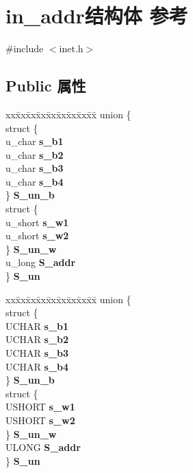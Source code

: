 \hypertarget{structin__addr}{}\section{in\+\_\+addr结构体 参考}
\label{structin__addr}


{\ttfamily \#include $<$inet.\+h$>$}

\subsection*{Public 属性}
\begin{DoxyCompactItemize}
\item 
\mbox{\label{structin__addr_a83cb466b4e27637f9dc381afa9f4c022}} 
\begin{tabbing}
xx\=xx\=xx\=xx\=xx\=xx\=xx\=xx\=xx\=\kill
union \{\\
\>struct \{\\
\>\>u\_char {\bfseries s\_b1}\\
\>\>u\_char {\bfseries s\_b2}\\
\>\>u\_char {\bfseries s\_b3}\\
\>\>u\_char {\bfseries s\_b4}\\
\>\} {\bfseries S\_un\_b}\\
\>struct \{\\
\>\>u\_short {\bfseries s\_w1}\\
\>\>u\_short {\bfseries s\_w2}\\
\>\} {\bfseries S\_un\_w}\\
\>u\_long {\bfseries S\_addr}\\
\} {\bfseries S\_un}\\

\end{tabbing}\item 
\mbox{\label{structin__addr_afa31e3df374c800b6c1a587cc26eef59}} 
\begin{tabbing}
xx\=xx\=xx\=xx\=xx\=xx\=xx\=xx\=xx\=\kill
union \{\\
\>struct \{\\
\>\>UCHAR {\bfseries s\_b1}\\
\>\>UCHAR {\bfseries s\_b2}\\
\>\>UCHAR {\bfseries s\_b3}\\
\>\>UCHAR {\bfseries s\_b4}\\
\>\} {\bfseries S\_un\_b}\\
\>struct \{\\
\>\>USHORT {\bfseries s\_w1}\\
\>\>USHORT {\bfseries s\_w2}\\
\>\} {\bfseries S\_un\_w}\\
\>ULONG {\bfseries S\_addr}\\
\} {\bfseries S\_un}\\


\end{tabbing}
\end{DoxyCompactItemize}
